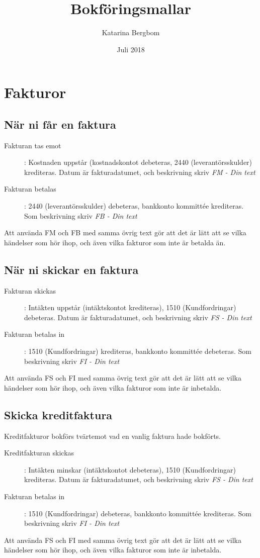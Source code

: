 \documentclass{article}
\title{Bokföringsmallar}
\author{Katarina Bergbom}
\date{Juli 2018}
\begin{document}
\maketitle
\tableofcontents

\section{Fakturor}
\subsection{När ni får en faktura}
\begin{description}
    \item [Fakturan tas emot]: Kostnaden uppstår (kostnadskontot debeteras, 2440 (leverantörsskulder) krediteras. Datum är fakturadatumet, och beskrivning skriv \textit{FM - Din text}
    \item [Fakturan betalas]: 2440 (leverantörsskulder) debeteras, bankkonto kommittée krediteras. Som beskrivning skriv \textit{FB - Din text}
\end{description}
Att använda FM och FB med samma övrig text gör att det är lätt att se vilka händelser som hör ihop, och även vilka fakturor som inte är betalda än.
\subsection{När ni skickar en faktura}
\begin{description}
    \item [Fakturan skickas]: Intäkten uppstår (intäktskontot krediteras), 1510 (Kundfordringar) debeteras. Datum är fakturadatumet, och beskrivning skriv \textit{FS - Din text}
    \item [Fakturan betalas in]: 1510 (Kundfordringar) krediteras, bankkonto kommittée debeteras. Som beskrivning skriv \textit{FI - Din text}
\end{description}
Att använda FS och FI med samma övrig text gör att det är lätt att se vilka händelser som hör ihop, och även vilka fakturor som inte är inbetalda.

\subsection{Skicka kreditfaktura}
Kreditfakturor bokförs tvärtemot vad en vanlig faktura hade bokförts.
\begin{description}
    \item [Kreditfakturan skickas]: Intäkten minskar (intäktskontot debeteras), 1510 (Kundfordringar) krediteras. Datum är fakturadatumet, och beskrivning skriv \textit{FS - Din text}
    \item [Fakturan betalas in]: 1510 (Kundfordringar) debeteras, bankkonto kommittée krediteras. Som beskrivning skriv \textit{FI - Din text}
\end{description}
Att använda FS och FI med samma övrig text gör att det är lätt att se vilka händelser som hör ihop, och även vilka fakturor som inte är inbetalda.
\end{document}
